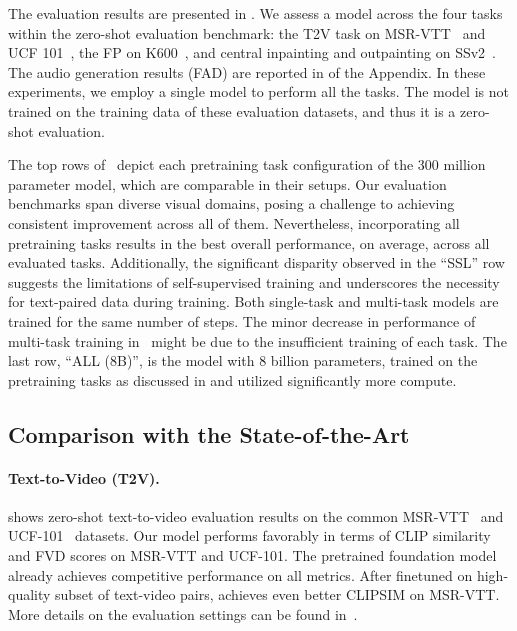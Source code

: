 The evaluation results are presented in .
%
We assess a model across the four tasks within the zero-shot evaluation benchmark: the T2V task on MSR-VTT~\cite{xu2016msr} and UCF 101~\cite{soomro2012ucf101}, the FP on K600~\cite{carreira2018short}, and central inpainting and outpainting on SSv2~\cite{goyal2017something}. The audio generation results (FAD) are reported in  of the Appendix.
%
In these experiments, we employ a single model to perform all the tasks. 
The model is not trained on the training data of these evaluation datasets, and thus it is a zero-shot evaluation.

The top rows of~ depict each pretraining task configuration of the 300 million parameter model, which are comparable in their setups.
%
Our evaluation benchmarks span diverse visual domains, posing a challenge to achieving consistent improvement across all of them.
%
Nevertheless, incorporating all pretraining tasks results in the best overall performance, on average, across all evaluated tasks. 
%
Additionally, the significant disparity observed in the ``SSL'' row suggests the limitations of self-supervised training and underscores the necessity for text-paired data during training. Both single-task and multi-task models are trained for the same number of steps. The minor decrease in performance of multi-task training in~ might be due to the insufficient training of each task.
%
The last row, ``ALL (8B)'', is the model with 8 billion parameters, trained on the pretraining tasks as discussed in  and utilized significantly more compute. 



\vspace{-2mm}
\subsection{Comparison with the State-of-the-Art}

\paragraph{Text-to-Video (T2V).}
\label{sec:exp_t2v}
 shows zero-shot text-to-video evaluation results on the common MSR-VTT~\cite{xu2016msr} and UCF-101~\cite{soomro2012ucf101} datasets. 
%
Our model performs favorably in terms of CLIP similarity and FVD scores on MSR-VTT and UCF-101. 
%
The pretrained foundation model already achieves competitive performance on all metrics.
%
After finetuned on high-quality subset of text-video pairs, \modelname{} achieves even better CLIPSIM on MSR-VTT.
%
More details on the evaluation settings can be found in~.



